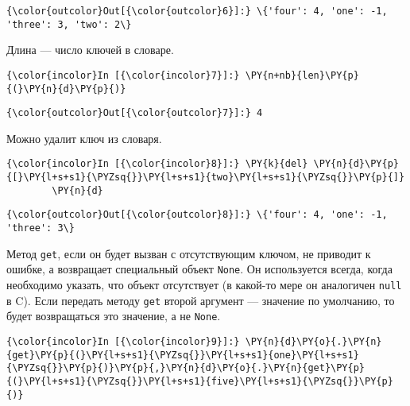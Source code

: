             \begin{Verbatim}[commandchars=\\\{\}]
{\color{outcolor}Out[{\color{outcolor}6}]:} \{'four': 4, 'one': -1, 'three': 3, 'two': 2\}
\end{Verbatim}
        
    Длина --- число ключей в словаре.

    \begin{Verbatim}[commandchars=\\\{\}]
{\color{incolor}In [{\color{incolor}7}]:} \PY{n+nb}{len}\PY{p}{(}\PY{n}{d}\PY{p}{)}
\end{Verbatim}

            \begin{Verbatim}[commandchars=\\\{\}]
{\color{outcolor}Out[{\color{outcolor}7}]:} 4
\end{Verbatim}
        
    Можно удалит ключ из словаря.

    \begin{Verbatim}[commandchars=\\\{\}]
{\color{incolor}In [{\color{incolor}8}]:} \PY{k}{del} \PY{n}{d}\PY{p}{[}\PY{l+s+s1}{\PYZsq{}}\PY{l+s+s1}{two}\PY{l+s+s1}{\PYZsq{}}\PY{p}{]}
        \PY{n}{d}
\end{Verbatim}

            \begin{Verbatim}[commandchars=\\\{\}]
{\color{outcolor}Out[{\color{outcolor}8}]:} \{'four': 4, 'one': -1, 'three': 3\}
\end{Verbatim}
        
    Метод \texttt{get}, если он будет вызван с отсутствующим ключом, не
приводит к ошибке, а возвращает специальный объект \texttt{None}. Он
используется всегда, когда необходимо указать, что объект отсутствует (в
какой-то мере он аналогичен \texttt{null} в C). Если передать методу
\texttt{get} второй аргумент --- значение по умолчанию, то будет
возвращаться это значение, а не \texttt{None}.

    \begin{Verbatim}[commandchars=\\\{\}]
{\color{incolor}In [{\color{incolor}9}]:} \PY{n}{d}\PY{o}{.}\PY{n}{get}\PY{p}{(}\PY{l+s+s1}{\PYZsq{}}\PY{l+s+s1}{one}\PY{l+s+s1}{\PYZsq{}}\PY{p}{)}\PY{p}{,}\PY{n}{d}\PY{o}{.}\PY{n}{get}\PY{p}{(}\PY{l+s+s1}{\PYZsq{}}\PY{l+s+s1}{five}\PY{l+s+s1}{\PYZsq{}}\PY{p}{)}
\end{Verbatim}


